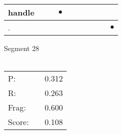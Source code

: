 \documentclass[landscape]{article}
\newcommand{\ssp}{\hspace{2pt}}
\newcommand{\mex}{\cellcolor{g}$\bullet$}
\begin{document}
\begin{tabular}{|l|p{10pt}|p{10pt}|p{10pt}|p{10pt}|p{10pt}|p{10pt}|p{10pt}|p{10pt}|p{10pt}|}
\hline
\ssp \cellcolor{ref2}handle \ssp&\hspace{2pt}&\hspace{2pt}&\hspace{2pt}\mex&\hspace{2pt}&\hspace{2pt}&\hspace{2pt}&\hspace{2pt}&\hspace{2pt}&\hspace{2pt}\\
\hline
\ssp \cellcolor{ref8}. \ssp&\hspace{2pt}&\hspace{2pt}&\hspace{2pt}&\hspace{2pt}&\hspace{2pt}&\hspace{2pt}&\hspace{2pt}&\hspace{2pt}&\hspace{2pt}\mex\\
\hline
\end{tabular}

\vspace{6pt}
\noindent Segment 28\\\\
\noindent\begin{tabular}{lm{12pt}r}
\hline
P:&&0.312\\
R:&&0.263\\
Frag:&&0.600\\
Score:&&0.108\\
\end{tabular}

\newpage
\end{document}
